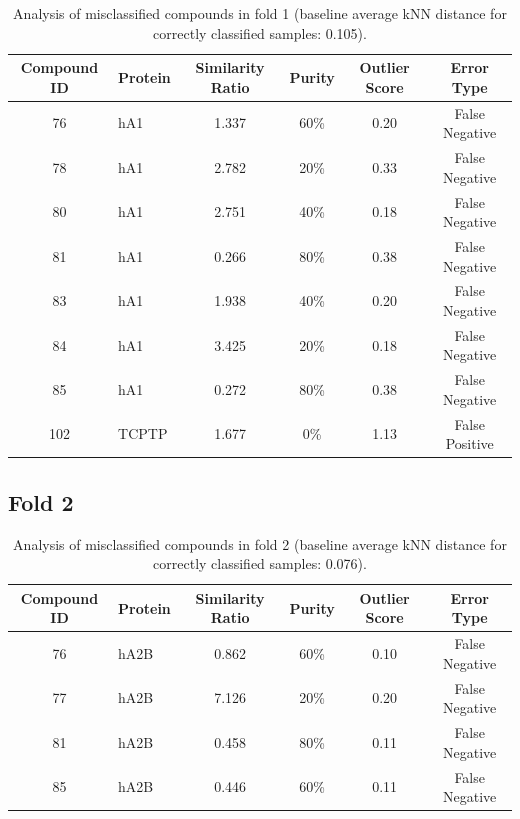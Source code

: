 \documentclass{article}
\newenvironment{smarttabular}[1]{%
    \begin{tabular}{#1}%
}{%
    \end{tabular}%
}
\begin{document}
\begin{table}[H]
    \centering
    \small
    \caption{Analysis of misclassified compounds in fold 1 (baseline average kNN distance for correctly classified samples: 0.105).}
    \label{tab:misclassified_compounds_1}
    \begin{smarttabular}{clcccc}
        \toprule
        \textbf{Compound ID} & \textbf{Protein} & \textbf{Similarity Ratio} & \textbf{Purity} & \textbf{Outlier Score} & \textbf{Error Type} \\
        \midrule
        76 & hA1 & 1.337 & 60\% & 0.20 & False Negative \\
        78 & hA1 & 2.782 & 20\% & 0.33 & False Negative \\
        80 & hA1 & 2.751 & 40\% & 0.18 & False Negative \\
        81 & hA1 & 0.266 & 80\% & 0.38 & False Negative \\
        83 & hA1 & 1.938 & 40\% & 0.20 & False Negative \\
        84 & hA1 & 3.425 & 20\% & 0.18 & False Negative \\
        85 & hA1 & 0.272 & 80\% & 0.38 & False Negative \\
        102 & TCPTP & 1.677 & 0\% & 1.13 & False Positive \\
        \bottomrule
    \end{smarttabular}
\end{table}

\clearpage

\subsection{Fold 2}

\begin{table}[H]
    \centering
    \small
    \caption{Analysis of misclassified compounds in fold 2 (baseline average kNN distance for correctly classified samples: 0.076).}
    \label{tab:misclassified_compounds_2}
    \begin{smarttabular}{clcccc}
        \toprule
        \textbf{Compound ID} & \textbf{Protein} & \textbf{Similarity Ratio} & \textbf{Purity} & \textbf{Outlier Score} & \textbf{Error Type} \\
        \midrule
        76 & hA2B & 0.862 & 60\% & 0.10 & False Negative \\
        77 & hA2B & 7.126 & 20\% & 0.20 & False Negative \\
        81 & hA2B & 0.458 & 80\% & 0.11 & False Negative \\
        85 & hA2B & 0.446 & 60\% & 0.11 & False Negative \\
        \bottomrule
    \end{smarttabular}
\end{table}
\end{document}
